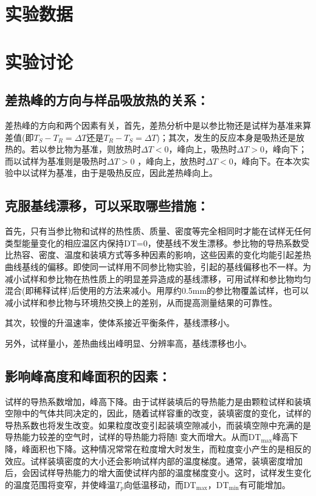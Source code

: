 \documentclass[a4paper]{article}
\begin{document}
\section{实验数据}

\section{实验讨论}
\subsection{差热峰的方向与样品吸放热的关系：}
差热峰的方向和两个因素有关，首先，差热分析中是以参比物还是试样为基准来算差值(即$T_S-T_R=\Delta T$还是$T_R-T_S=\Delta T$)；其次，发生的反应本身是吸热还是放热的。若以参比物为基准，则放热时$\Delta T<$0，峰向上，吸热时$\Delta T>$0，峰向下；而以试样为基准则是吸热时$\Delta T>$0 ，峰向上，放热时$\Delta T<$0，峰向下。在本次实验中以试样为基准，由于是吸热反应，因此差热峰向上。
\subsection{克服基线漂移，可以采取哪些措施：}
首先，只有当参比物和试样的热性质、质量、密度等完全相同时才能在试样无任何类型能量变化的相应温区内保持DT=0，使基线不发生漂移。参比物的导热系数受比热容、密度、温度和装填方式等多种因素的影响，这些因素的变化均能引起差热曲线基线的偏移。即使同一试样用不同参比物实验，引起的基线偏移也不一样。为减小试样和参比物在热性质上的明显差异造成的基线漂移，可用试样和参比物均匀混合(即稀释试样)后使用的方法来减小。用厚约0.5mm的参比物覆盖试样，也可以减小试样和参比物与环境热交换上的差别，从而提高测量结果的可靠性。

其次，较慢的升温速率，使体系接近平衡条件，基线漂移小。

另外，试样量小，差热曲线出峰明显、分辨率高，基线漂移也小。
\subsection{影响峰高度和峰面积的因素：}
试样的导热系数增加，峰高下降。由于试样装填后的导热能力是由颗粒试样和装填空隙中的气体共同决定的，因此，随着试样容重的改变，装填密度的变化，试样的导热系数也将发生改变。如果粒度改变引起装填空隙减小，而装填空隙中充满的是导热能力较差的空气时，试样的导热能力将随l 变大而增大。从而$\text{DT}_{\text{max}}$峰高下降，峰面积也下降。这种情况常常在粒度增大时发生，而粒度变小产生的是相反的效应。试样装填密度的大小还会影响试样内部的温度梯度。通常，装填密度增加后，会因试样导热能力的增大面使试样内部的温度梯度变小。这时，试样发生变化的温度范围将变窄，并使峰温$T_p$向低温移动，而$\text{DT}_{\text{max}}$，$\text{DT}_{\text{min}}$有可能增加。
\end{document}
